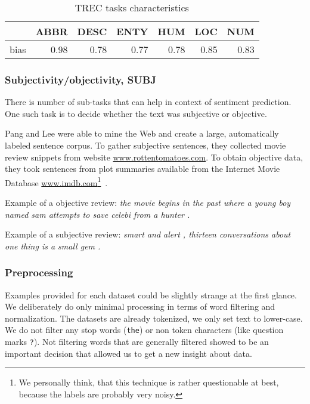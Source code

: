     \begin{table}[h]
    \begin{center}
    
    \begin{tabular}{lrrrrrr}
    \toprule
    {} &  ABBR &  DESC &  ENTY &   HUM &   LOC &   NUM \\
    \midrule
    bias &  0.98 &  0.78 &  0.77 &  0.78 &  0.85 &  0.83 \\
    \bottomrule
    \end{tabular}
    
    \caption[TREC tasks characteristics]{TREC tasks characteristics}
    \label{tab:trec:stats}
    \end{center}
    \end{table}

    \subsubsection{Subjectivity/objectivity, SUBJ}
    
    There is number of sub-tasks that can help in context of sentiment prediction.
    One such task is to decide whether the text was subjective or objective.
        
    Pang and Lee were able to mine the Web and create a large, automatically labeled sentence corpus. 
    To gather subjective sentences, they collected movie review snippets from website  \url{www.rottentomatoes.com}.
    To obtain objective data, they took sentences from plot summaries available from the Internet Movie Database \url{www.imdb.com}\footnote{We personally think, that this technique is rather questionable at best, because the labels are probably very noisy.}~\cite{pang2004sentimental}.
    
    Example of a objective review:
    \emph{the movie begins in the past where a young boy named sam attempts to save celebi from a hunter .}

    Example of a subjective review:
    \emph{smart and alert , thirteen conversations about one thing is a small gem .}
    

    \subsubsection{Preprocessing} \label{sec:preprocessing}
    
    Examples provided for each dataset could be slightly strange at the first glance.
    We deliberately do only minimal processing in terms of word filtering and normalization.
    The datasets are already tokenized, we only set text to lower-case.
    We do not filter any stop words (\texttt{the}) or non token characters (like question marks \texttt{?}). 
    Not filtering words that are generally filtered showed to be an important decision that allowed us to get a new insight about data.
    
